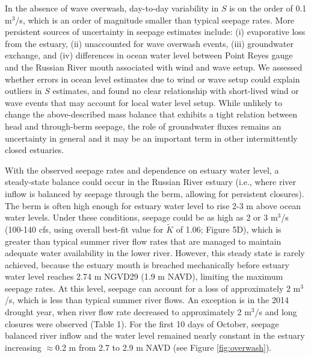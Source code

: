 \documentclass[preprint,12pt,authoryear]{elsarticle}
\begin{document}
In the absence of wave overwash,  day-to-day variability in $S$ is on the order of 0.1 m$^3$/s, which is an order of magnitude smaller than typical seepage rates. More persistent sources of uncertainty in seepage estimates include: 
(i)  evaporative loss from the estuary, 
(ii) unaccounted for wave overwash events, 
(iii) groundwater exchange, and 
(iv) differences in ocean water level between Point Reyes gauge and the Russian River mouth associated with wind and wave setup. We assessed whether errors in ocean level estimates due to wind or wave setup could  explain outliers in $S$ estimates, and found no clear relationship with short-lived wind or wave events that may account for local water level setup. While unlikely to change the above-described mass balance that exhibits a tight relation between head and through-berm seepage, the role of groundwater fluxes remains an uncertainty in general and it may be an important term in other intermittently closed estuaries.

With the observed seepage rates and dependence on estuary water level, a steady-state balance could occur in the Russian River estuary (i.e., where river inflow is balanced by seepage through the berm, allowing for persistent closures). The berm is often high enough for estuary water level to rise 2-3 m above ocean water levels. Under these conditions, seepage could be as high as 2 or 3 m$^3$/s (100-140 cfs, using overall best-fit value for $\tilde K$ of 1.06; Figure 5D), which is greater than typical summer river flow rates that are managed to maintain adequate water availability in the lower river.
However, this steady state is rarely achieved, because 
the estuary mouth is breached mechanically before estuary water level reaches 2.74 m NGVD29 (1.9 m NAVD), limiting the maximum seepage rates.
At this level, seepage can account for a loss of approximately 2 m$^3$/s, which is less than typical summer river flows. An exception is in the 2014 drought year, when river flow rate decreased to  approximately 2 m$^3$/s and long closures were observed (Table 1). For the first 10 days of October, seepage balanced river inflow and the water level remained nearly constant in the estuary increasing $\approx$0.2 m from 2.7 to 2.9 m NAVD (see Figure \ref{fig:overwash}). 
\end{document}
